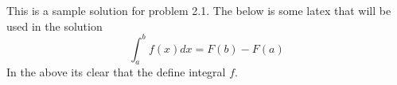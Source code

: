 This is a sample solution for problem 2.1. The below is some latex that
will be used in the solution \[\int_{a}^b f(x) dx = F(b) - F(a)\] In the
above its clear that the define integral \(f\).

